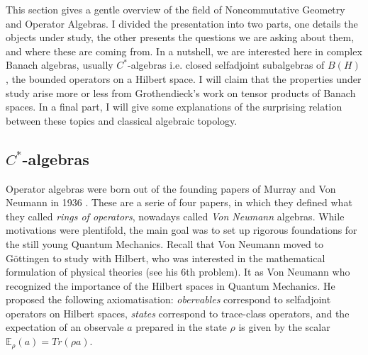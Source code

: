 
This section gives a gentle overview of the field of Noncommutative Geometry and Operator Algebras. I divided the presentation into two parts, one details the objects under study, the other presents the questions we are asking about them, and where these are coming from. In a nutshell, we are interested here in complex Banach algebras, usually $C^*$-algebras i.e. closed selfadjoint subalgebras of $B(H)$, the bounded operators on a Hilbert space. I will claim that the properties under study arise more or less from Grothendieck's work on tensor products of Banach spaces. In a final part, I will give some explanations of the surprising relation between these topics and classical algebraic topology.   

\subsection{$C^*$-algebras}

Operator algebras were born out of the founding papers of Murray and Von Neumann in 1936 \cite{murray1936rings}. These are a serie of four papers, in which they defined what they called \textit{rings of operators}, nowadays called \textit{Von Neumann} algebras. While motivations were plentifold, the main goal was to set up rigorous foundations for the still young Quantum Mechanics. Recall that Von Neumann moved to G\"ottingen to study with Hilbert, who was interested in the mathematical formulation of physical theories (see his 6th problem). It as Von Neumann who recognized the importance of the Hilbert spaces in Quantum Mechanics. He proposed the following axiomatisation: \textit{obervables} correspond to selfadjoint operators on Hilbert spaces, \textit{states} correspond to trace-class operators, and the expectation of an observale $a$ prepared in the state $\rho$ is given by the scalar $\mathbb E_{\rho}(a) = Tr(\rho a)$.\\

